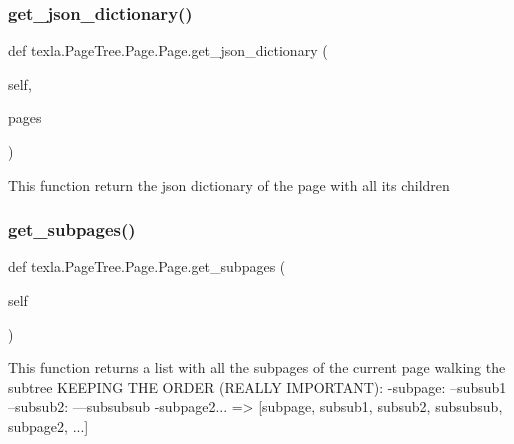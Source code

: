 \subsubsection{\texorpdfstring{get\+\_\+json\+\_\+dictionary()}{get\_json\_dictionary()}}
{\footnotesize\ttfamily def texla.\+Page\+Tree.\+Page.\+Page.\+get\+\_\+json\+\_\+dictionary (\begin{DoxyParamCaption}\item[{}]{self,  }\item[{}]{pages }\end{DoxyParamCaption})}

\begin{DoxyVerb}This function return the json dictionary of the page
with all its children\end{DoxyVerb}
 \hypertarget{classtexla_1_1PageTree_1_1Page_1_1Page_a6d72f71ac5e2997ad4cc46857223081b}{}\label{classtexla_1_1PageTree_1_1Page_1_1Page_a6d72f71ac5e2997ad4cc46857223081b} 
\subsubsection{\texorpdfstring{get\+\_\+subpages()}{get\_subpages()}}
{\footnotesize\ttfamily def texla.\+Page\+Tree.\+Page.\+Page.\+get\+\_\+subpages (\begin{DoxyParamCaption}\item[{}]{self }\end{DoxyParamCaption})}

\begin{DoxyVerb}This function returns a list with all the subpages
of the current page walking the subtree
KEEPING THE ORDER (REALLY IMPORTANT):
-subpage:
    --subsub1
    --subsub2:
---subsubsub
-subpage2...
=> [subpage, subsub1, subsub2, subsubsub, subpage2, ...]\end{DoxyVerb}
 \hypertarget{classtexla_1_1PageTree_1_1Page_1_1Page_a83054589cb1c1f29959693ac9ab8fd93}{}\label{classtexla_1_1PageTree_1_1Page_1_1Page_a83054589cb1c1f29959693ac9ab8fd93} 
